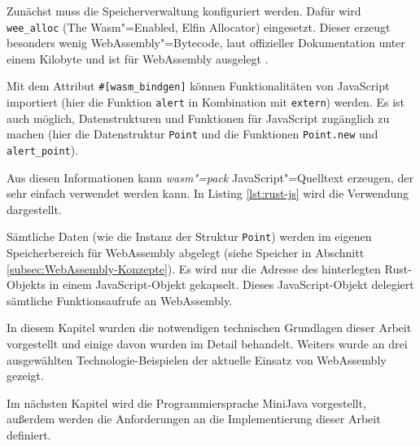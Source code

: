 Zunächst muss die Speicherverwaltung konfiguriert werden. Dafür wird \lstinline{wee_alloc} (The Wasm"=Enabled, Elfin Allocator) eingesetzt. Dieser erzeugt besonders wenig WebAssembly"=Bytecode, laut offizieller Dokumentation unter einem Kilobyte und ist für WebAssembly ausgelegt \cite{WeeAlloc}.

Mit dem Attribut \lstinline{#[wasm_bindgen]} können Funktionalitäten von JavaScript importiert (hier die Funktion \lstinline{alert} in Kombination mit \lstinline{extern}) werden. Es ist auch möglich, Datenstrukturen und Funktionen für JavaScript zugänglich zu machen (hier die Datenstruktur \lstinline{Point} und die Funktionen \lstinline{Point.new} und \lstinline{alert_point}).

Aus diesen Informationen kann \emph{wasm"=pack} JavaScript"=Quelltext erzeugen, der sehr einfach verwendet werden kann. In Listing \ref{lst:rust-js} wird die Verwendung dargestellt. 



Sämtliche Daten (wie die Instanz der Struktur \lstinline{Point}) werden im eigenen Speicherbereich für WebAssembly abgelegt (siehe Speicher in Abschnitt \ref{subsec:WebAssembly-Konzepte}). Es wird nur die Adresse des hinterlegten Rust-Objekts in einem JavaScript-Objekt gekapselt. Dieses JavaScript-Objekt delegiert sämtliche Funktionsaufrufe an WebAssembly.

\vspace{4em}
In diesem Kapitel wurden die notwendigen technischen Grundlagen dieser Arbeit vorgestellt und einige davon wurden im Detail behandelt. Weiters wurde an drei ausgewählten Technologie-Beispielen der aktuelle Einsatz von WebAssembly gezeigt.

Im nächsten Kapitel wird die Programmiersprache MiniJava vorgestellt, außerdem werden die Anforderungen an die Implementierung dieser Arbeit definiert.
